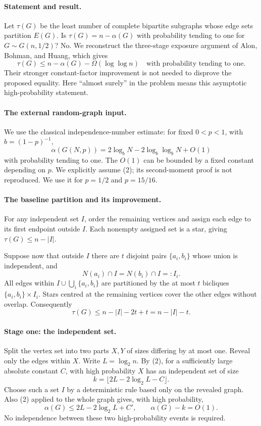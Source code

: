 \paragraph{Statement and result.}
Let \(\tau(G)\) be the least number of complete bipartite subgraphs whose edge sets partition \(E(G)\). Is \(\tau(G)=n-\alpha(G)\) with probability tending to one for \(G\sim G(n,1/2)\)? No. We reconstruct the three-stage exposure argument of Alon, Bohman, and Huang, which gives
\[
 \tau(G)\leq n-\alpha(G)-\Omega(\log\log n)
 \quad\text{with probability tending to one}.
\tag{1}
\]
Their stronger constant-factor improvement is not needed to disprove the proposed equality. Here ``almost surely'' in the problem means this asymptotic high-probability statement.

\paragraph{The external random-graph input.}
We use the classical independence-number estimate: for fixed \(0<p<1\), with \(b=(1-p)^{-1}\),
\[
 \alpha(G(N,p))=2\log_bN-2\log_b\log_bN+O(1)
\tag{2}
\]
with probability tending to one. The \(O(1)\) can be bounded by a fixed constant depending on \(p\). We explicitly assume (2); its second-moment proof is not reproduced. We use it for \(p=1/2\) and \(p=15/16\).

\paragraph{The baseline partition and its improvement.}
For any independent set \(I\), order the remaining vertices and assign each edge to its first endpoint outside \(I\). Each nonempty assigned set is a star, giving \(\tau(G)\leq n-|I|\).

Suppose now that outside \(I\) there are \(t\) disjoint pairs \(\{a_i,b_i\}\) whose union is independent, and
\[
 N(a_i)\cap I=N(b_i)\cap I=:I_i.
\tag{3}
\]
All edges within \(I\cup\bigcup_i\{a_i,b_i\}\) are partitioned by the at most \(t\) bicliques \(\{a_i,b_i\}\times I_i\). Stars centred at the remaining vertices cover the other edges without overlap. Consequently
\[
 \tau(G)\leq n-|I|-2t+t=n-|I|-t.
\tag{4}
\]

\paragraph{Stage one: the independent set.}
Split the vertex set into two parts \(X,Y\) of sizes differing by at most one. Reveal only the edges within \(X\). Write \(L=\log_2 n\). By (2), for a sufficiently large absolute constant \(C\), with high probability \(X\) has an independent set of size
\[
 k=\lfloor2L-2\log_2L-C\rfloor.
\]
Choose such a set \(I\) by a deterministic rule based only on the revealed graph. Also (2) applied to the whole graph gives, with high probability,
\[
 \alpha(G)\leq2L-2\log_2L+C',
 \qquad \alpha(G)-k=O(1).
\tag{5}
\]
No independence between these two high-probability events is required.

